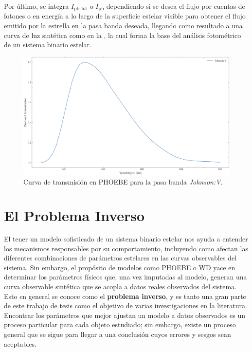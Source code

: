 Por último, se integra $I_{\mathrm{pb}, \mathrm{fot}}$ o $I_{\mathrm{pb}}$\textemdash
dependiendo si se desea el flujo por cuentas de fotones o en energía\textemdash
a lo largo de la superficie estelar visible para obtener el flujo emitido por la
estrella en la pasa banda deseada, llegando como resultado a una curva de luz
sintética como en la , la cual
forma la base del análisis fotométrico de un sistema binario estelar.

\begin{figure}[!ht]
	\centering
	\includegraphics[scale=0.4]{Introduccion/Figures/Figura PHOEBE JohnsonV Pasabanda.png}
	\caption{Curva de transmisión en PHOEBE para la pasa banda \textit{Johnson:V}.}
	\label{figuraPhoebePasabandaJohnsonV}
\end{figure}

\section{El Problema Inverso}

El tener un modelo sofisticado de un sistema binario estelar nos ayuda a
entender los mecanismos responsables por su comportamiento, incluyendo como
afectan las diferentes combinaciones de parámetros estelares en las curvas
observables del sistema. Sin embargo, el propósito de modelos como PHOEBE o WD
yace en determinar los parámetros físicos que, una vez imputadas al modelo,
generan una curva observable sintética que se acopla a datos reales observados
del sistema. Esto en general se conoce como el \textbf{problema inverso}, y es
tanto una gran parte de este trabajo de tesis como el objetivo de varias
investigaciones en la literatura. Encontrar los parámetros que mejor ajustan un
modelo a datos observados es un proceso particular para cada objeto estudiado;
sin embargo, existe un proceso general que se sigue para llegar a una conclusión
cuyos errores y sesgos sean aceptables.

